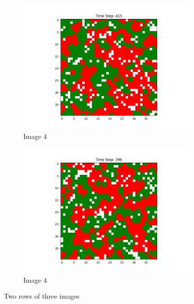 \documentclass[12pt]{article}
\begin{document}
\begin{figure}[h]
\begin{subfigure}{0.2\textwidth}
			\includegraphics[width=\linewidth]{final_social_n20p3.png}
			\caption{Image 4}
		\end{subfigure}\hspace{0.02\textwidth}
		\begin{subfigure}{0.2\textwidth}
			\includegraphics[width=\linewidth]{final_social_n20p5.png}
			\caption{Image 4}
		\end{subfigure}\hspace{0.02\textwidth}
		\caption{Two rows of three images}
	\end{figure}
\end{document}
